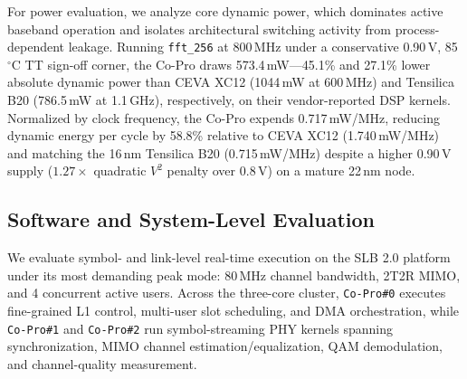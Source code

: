 \documentclass[9pt,conference]{IEEEtran}
\begin{document}
For power evaluation, we analyze core dynamic power, which dominates active baseband operation and isolates architectural switching activity from process-dependent leakage. Running \texttt{fft\_256} at 800\,MHz under a conservative 0.90\,V, 85\,$^\circ$C TT sign-off corner, the Co-Pro draws 573.4\,mW---45.1\% and 27.1\% lower absolute dynamic power than CEVA XC12 (1044\,mW at 600\,MHz) and Tensilica B20 (786.5\,mW at 1.1\,GHz), respectively, on their vendor-reported DSP kernels. Normalized by clock frequency, the Co-Pro expends 0.717\,mW/MHz, reducing dynamic energy per cycle by 58.8\% relative to CEVA XC12 (1.740\,mW/MHz) and matching the 16\,nm Tensilica B20 (0.715\,mW/MHz) despite a higher 0.90\,V supply ($1.27\times$ quadratic $V^2$ penalty over 0.8\,V) on a mature 22\,nm node.

\subsection{Software and System-Level Evaluation}

We evaluate symbol- and link-level real-time execution on the SLB 2.0 platform under its most demanding peak mode: 80\,MHz channel bandwidth, 2T2R MIMO, and 4 concurrent active users. Across the three-core cluster, \texttt{Co-Pro\#0} executes fine-grained L1 control, multi-user slot scheduling, and DMA orchestration, while \texttt{Co-Pro\#1} and \texttt{Co-Pro\#2} run symbol-streaming PHY kernels spanning synchronization, MIMO channel estimation/equalization, QAM demodulation, and channel-quality measurement.
\end{document}
